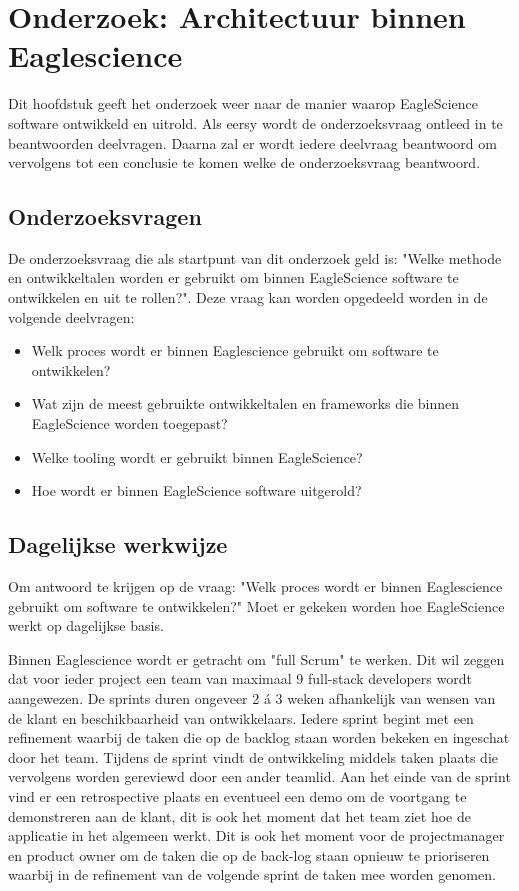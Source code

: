 \chapter{Onderzoek: Architectuur binnen Eaglescience}\label{ch:onderzoek:-architectuur-binnen-eaglescience} %


Dit hoofdstuk geeft het onderzoek weer naar de manier waarop EagleScience software ontwikkeld en uitrold. Als eersy wordt de onderzoeksvraag ontleed in te beantwoorden deelvragen. Daarna zal er wordt iedere deelvraag beantwoord om vervolgens tot een conclusie te komen welke de onderzoeksvraag beantwoord.
\section{Onderzoeksvragen}\label{sec:ESOnderzoeksVraag}
De onderzoeksvraag die als startpunt van dit onderzoek geld is: "Welke methode en ontwikkeltalen worden er gebruikt om binnen EagleScience software te ontwikkelen en uit te rollen?". Deze vraag kan worden opgedeeld worden in de volgende deelvragen:

\begin{itemize}
  \item Welk proces wordt er binnen Eaglescience gebruikt om software te ontwikkelen?
  \item Wat zijn de meest gebruikte ontwikkeltalen en frameworks die binnen EagleScience worden toegepast?
  \item Welke tooling wordt er gebruikt binnen EagleScience?
  \item Hoe wordt er binnen EagleScience software uitgerold?
\end{itemize}


\section{Dagelijkse werkwijze}\label{sec:dagelijkse-werkwijze}
Om antwoord te krijgen op de vraag: "Welk proces wordt er binnen Eaglescience gebruikt om software te ontwikkelen?" Moet er gekeken worden hoe EagleScience werkt op dagelijkse basis.

Binnen Eaglescience wordt er getracht om "full Scrum" te werken. Dit wil zeggen dat voor ieder project een team van maximaal 9 full-stack developers wordt aangewezen. De sprints duren ongeveer 2 á 3 weken afhankelijk van wensen van de klant en beschikbaarheid van ontwikkelaars. Iedere sprint begint met een refinement waarbij de taken die op de backlog staan worden bekeken en ingeschat door het team. Tijdens de sprint vindt de ontwikkeling middels taken plaats die vervolgens worden gereviewd door een ander teamlid. Aan het einde van de sprint vind er een retrospective plaats en eventueel een demo om de voortgang te demonstreren aan de klant, dit is ook het moment dat het team ziet hoe de applicatie in het algemeen werkt. Dit is ook het moment voor de projectmanager en product owner om de taken die op de back-log staan opnieuw te prioriseren waarbij in de refinement van de volgende sprint de taken mee worden genomen.

